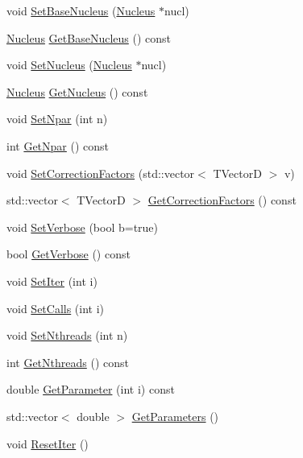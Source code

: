 \begin{DoxyCompactItemize}
\item 
void \hyperlink{classCoulExMinFCN_a3924912b5a05cb7966a569e11a6ab912}{Set\-Base\-Nucleus} (\hyperlink{classNucleus}{Nucleus} $\ast$nucl)
\item 
\hyperlink{classNucleus}{Nucleus} \hyperlink{classCoulExMinFCN_aca08dec223253bd86022ebf5358d837a}{Get\-Base\-Nucleus} () const 
\item 
void \hyperlink{classCoulExMinFCN_a4154d0ca6197aff0c360a18b846718bf}{Set\-Nucleus} (\hyperlink{classNucleus}{Nucleus} $\ast$nucl)
\item 
\hyperlink{classNucleus}{Nucleus} \hyperlink{classCoulExMinFCN_a04819cb7504e0d38a530923c3a9cdb87}{Get\-Nucleus} () const 
\item 
void \hyperlink{classCoulExMinFCN_aa7a93d1dbdf39271e8e7f1aedbbda147}{Set\-Npar} (int n)
\item 
int \hyperlink{classCoulExMinFCN_a558a013938717c422f66a9a955d78662}{Get\-Npar} () const 
\item 
void \hyperlink{classCoulExMinFCN_a6525e186ee14702162701414cda80fe1}{Set\-Correction\-Factors} (std\-::vector$<$ T\-Vector\-D $>$ v)
\item 
std\-::vector$<$ T\-Vector\-D $>$ \hyperlink{classCoulExMinFCN_a457c6cf81ad161d18c13e8bacd087a4a}{Get\-Correction\-Factors} () const 
\item 
void \hyperlink{classCoulExMinFCN_a04926d8c95503585735f0f79337376d1}{Set\-Verbose} (bool b=true)
\item 
bool \hyperlink{classCoulExMinFCN_acac974995031dd144882caee327f0284}{Get\-Verbose} () const 
\item 
void \hyperlink{classCoulExMinFCN_a4b5d3d75267cc59035d6697fceb3e8d3}{Set\-Iter} (int i)
\item 
void \hyperlink{classCoulExMinFCN_a70d61db9a8a7fee17671b637b3c0dee7}{Set\-Calls} (int i)
\item 
void \hyperlink{classCoulExMinFCN_a8fd85057cc72d10486ea25de6d37aa3d}{Set\-Nthreads} (int n)
\item 
int \hyperlink{classCoulExMinFCN_aee492209717d0c852ce0093a8f45b1d9}{Get\-Nthreads} () const 
\item 
double \hyperlink{classCoulExMinFCN_aa588591bbc923ab42070b42b74c1dfc8}{Get\-Parameter} (int i) const 
\item 
std\-::vector$<$ double $>$ \hyperlink{classCoulExMinFCN_ac49f8e36a62aac46b1300eca173f486f}{Get\-Parameters} ()
\item 
void \hyperlink{classCoulExMinFCN_ad15983e7cecf6fb939c55d47b2a9e700}{Reset\-Iter} ()
\end{DoxyCompactItemize}


